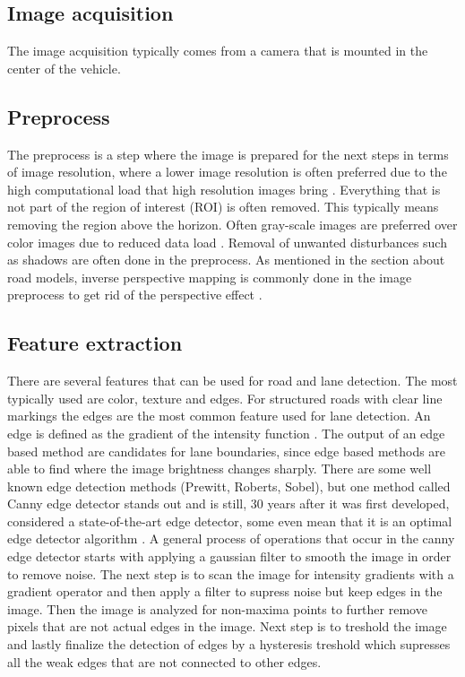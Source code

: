 \subsection{Image acquisition}
The image acquisition typically comes from a camera that is mounted in the center of the vehicle.
\subsection{Preprocess}
The preprocess is a step where the image is prepared for the next steps in terms of image resolution, where a lower image resolution is often preferred due to the high computational load that high resolution images bring \cite{Yenikaya:2013:KVR:2522968.2522970}. Everything that is not part of the region of interest (ROI) is often removed. This typically means removing the region above the horizon. Often gray-scale images are preferred over color images due to reduced data load \cite{Yenikaya:2013:KVR:2522968.2522970}. Removal of unwanted disturbances such as shadows are often done in the preprocess. As mentioned in the section about road models, inverse perspective mapping is commonly done in the image preprocess to get rid of the perspective effect \cite{bertozzi1998gold}.

\subsection{Feature extraction}
There are several features that can be used for road and lane detection. The most typically used are color, texture and edges. For structured roads with clear line markings the edges are the most common feature used for lane detection. An edge is defined as the gradient of the intensity function \cite{Yenikaya:2013:KVR:2522968.2522970}. The output of an edge based method are candidates for lane boundaries, since edge based methods are able to find where the image brightness changes sharply. There are some well known edge detection methods (Prewitt, Roberts, Sobel), but one method called Canny edge detector stands out and is still, 30 years after it was first developed, considered a state-of-the-art edge detector, some even mean that it is an optimal edge detector algorithm \cite{bhadauria2013comparison}. A general process of operations that occur in the canny edge detector starts with applying a gaussian filter to smooth the image in order to remove noise. The next step is to scan the image for intensity gradients with a gradient operator and then apply a filter to supress noise but keep edges in the image. Then the image is analyzed for non-maxima points to further remove pixels that are not actual edges in the image. Next step is to treshold the image and lastly finalize the detection of edges by a hysteresis treshold which supresses all the weak edges that are not connected to other edges.\\

